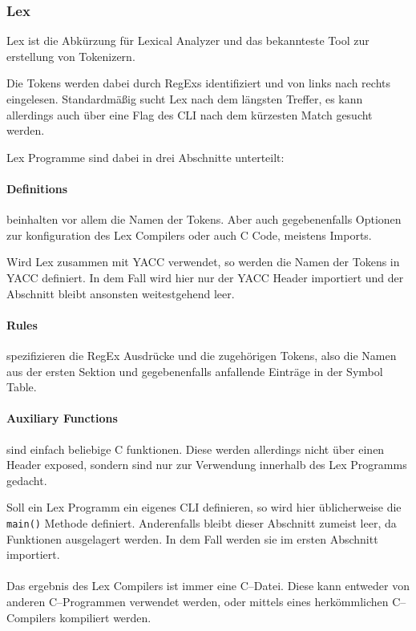 \subsubsection{Lex}\label{subsubsec:lex}
Lex ist die Abkürzung für Lexical Analyzer und das bekannteste Tool zur erstellung von Tokenizern.

Die Tokens werden dabei durch \acp{RegEx} identifiziert und von links nach rechts eingelesen.
Standardmäßig sucht Lex nach dem längsten Treffer, es kann allerdings auch über eine Flag des \ac{CLI} nach dem kürzesten Match gesucht werden.

Lex Programme sind dabei in drei Abschnitte unterteilt:


\paragraph{Definitions} beinhalten vor allem die Namen der Tokens.
Aber auch gegebenenfalls Optionen zur konfiguration des Lex Compilers oder auch C Code, meistens Imports.

Wird Lex zusammen mit \ac{YACC} verwendet, so werden die Namen der Tokens in YACC definiert.
In dem Fall wird hier nur der \ac{YACC} Header importiert und der Abschnitt bleibt ansonsten weitestgehend leer.

\paragraph{Rules} spezifizieren die \ac{RegEx} Ausdrücke und die zugehörigen Tokens, also die Namen aus der ersten Sektion und gegebenenfalls anfallende Einträge in der Symbol Table.
\lipsum[5]

\paragraph{Auxiliary Functions} sind einfach beliebige C funktionen.
Diese werden allerdings nicht über einen Header exposed, sondern sind nur zur Verwendung innerhalb des Lex Programms gedacht.

Soll ein Lex Programm ein eigenes \ac{CLI} definieren, so wird hier üblicherweise die \verb|main()| Methode definiert.
Anderenfalls bleibt dieser Abschnitt zumeist leer, da Funktionen ausgelagert werden.
In dem Fall werden sie im ersten Abschnitt importiert.

\paragraph*{}
Das ergebnis des Lex Compilers ist immer eine C--Datei.
Diese kann entweder von anderen C--Programmen verwendet werden, oder mittels eines herkömmlichen C--Compilers kompiliert werden.

